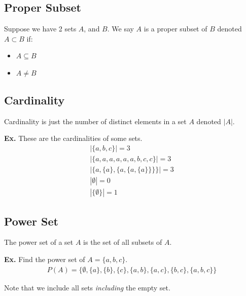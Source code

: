 \documentclass[12pt,letterpaper]{article} \usepackage{amsmath} \usepackage{graphicx}  \usepackage{longtable}  \usepackage{amssymb}
\begin{document}
        \subsection{Proper Subset}
        Suppose we have 2 sets $A$, and $B$. We say $A$ is a proper subset of $B$ denoted $A\subset B$ if:
        \begin{itemize}[noitemsep]
            \item $A\subseteq B$
            \item $A\ne B$
        \end{itemize}

        \subsection{Cardinality}
        Cardinality is just the number of distinct elements in a set $A$ denoted $|A|$. 

        \begin{mdframed}
            \textbf{Ex.} These are the cardinalities of some sets.
            \begin{align*}
                |\{a,b,c\}| = 3\\
                |\{a,a,a,a,a,a,b,c,c\}| = 3\\
                |\{a,\{a\},\{a,\{a,\{a\}\}\}\}| = 3\\
                |\emptyset| = 0\\
                |\{\emptyset\}| = 1
            \end{align*}

        \end{mdframed}

        \subsection{Power Set}
        The power set of a set $A$ is the set of all subsets of $A$. 

        \begin{mdframed}
            \textbf{Ex. } Find the power set of $A = \{a,b,c\}$.
            \begin{align*}
                P(A) = \{\emptyset, \{a\}, \{b\}, \{c\}, \{a,b\}, \{a,c\}, \{b,c\}, \{a,b,c\}\}
            \end{align*}

            Note that we include all sets \emph{including} the empty set. 

            
        \end{mdframed}
\end{document}
